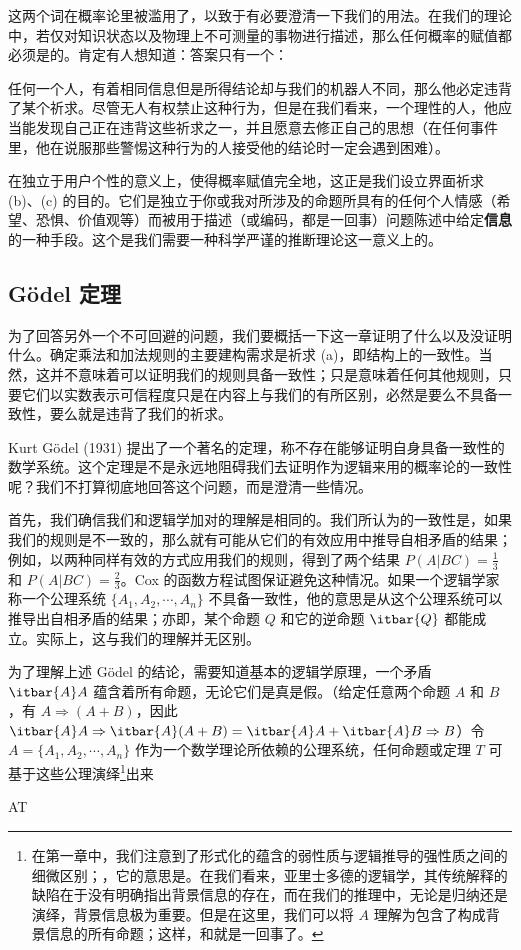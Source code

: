 这两个词在概率论里被滥用了，以致于有必要澄清一下我们的用法。在我们的理论中，若仅对知识状态以及物理上不可测量的事物进行描述，那么任何概率的赋值都必须是的。肯定有人想知道：答案只有一个：

任何一个人，有着相同信息但是所得结论却与我们的机器人不同，那么他必定违背了某个祈求。尽管无人有权禁止这种行为，但是在我们看来，一个理性的人，他应当能发现自己正在违背这些祈求之一，并且愿意去修正自己的思想（在任何事件里，他在说服那些警惕这种行为的人接受他的结论时一定会遇到困难）。

在独立于用户个性的意义上，使得概率赋值完全地，这正是我们设立界面祈求 (b)、(c) 的目的。它们是独立于你或我对所涉及的命题所具有的任何个人情感（希望、恐惧、价值观等）而被用于描述（或编码，都是一回事）问题陈述中给定{\bf 信息}的一种手段。这个是我们需要一种科学严谨的推断理论这一意义上的。

\subsection{G\"odel 定理}

为了回答另外一个不可回避的问题，我们要概括一下这一章证明了什么以及没证明什么。确定乘法和加法规则的主要建构需求是祈求 (a)，即结构上的一致性。当然，这并不意味着可以证明我们的规则具备一致性；只是意味着任何其他规则，只要它们以实数表示可信程度只是在内容上与我们的有所区别，必然是要么不具备一致性，要么就是违背了我们的祈求。

Kurt G\"odel (1931) 提出了一个著名的定理，称不存在能够证明自身具备一致性的数学系统。这个定理是不是永远地阻碍我们去证明作为逻辑来用的概率论的一致性呢？我们不打算彻底地回答这个问题，而是澄清一些情况。

首先，我们确信我们和逻辑学加对的理解是相同的。我们所认为的一致性是，如果我们的规则是不一致的，那么就有可能从它们的有效应用中推导自相矛盾的结果；例如，以两种同样有效的方式应用我们的规则，得到了两个结果 $P(A|BC) = \frac{1}{3}$ 和 $P(A|BC) = \frac{2}{3}$。Cox 的函数方程试图保证避免这种情况。如果一个逻辑学家称一个公理系统 $\{A_1,A_2,\cdots, A_n\}$ 不具备一致性，他的意思是从这个公理系统可以推导出自相矛盾的结果；亦即，某个命题 $Q$ 和它的逆命题 $\itbar{Q}$ 都能成立。实际上，这与我们的理解并无区别。

为了理解上述 G\"odel 的结论，需要知道基本的逻辑学原理，一个矛盾 $\itbar{A}A$ 蕴含着所有命题，无论它们是真是假。（给定任意两个命题 $A$ 和 $B$，有 $A\Rightarrow (A + B)$，因此 $\itbar{A}A\Rightarrow \itbar{A}(A+B) = \itbar{A}A + \itbar{A}B \Rightarrow B$）令 $A=\{A_1,A_2,\cdots,A_n\}$ 作为一个数学理论所依赖的公理系统，任何命题或定理 $T$ 可基于这些公理演绎\footnote{在第一章中，我们注意到了形式化的蕴含的弱性质与逻辑推导的强性质之间的细微区别；，它的意思是。在我们看来，亚里士多德的逻辑学，其传统解释的缺陷在于没有明确指出背景信息的存在，而在我们的推理中，无论是归纳还是演绎，背景信息极为重要。但是在这里，我们可以将 $A$ 理解为包含了构成背景信息的所有命题；这样，和就是一回事了。}出来

\placeformula[2-102]
\startformula
A\Rightarrow T
\stopformula